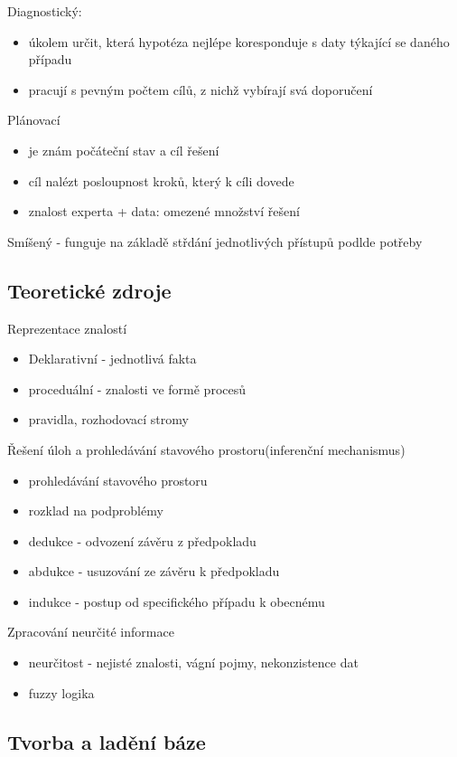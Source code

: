 Diagnostický:
\begin{itemize}
    \item úkolem určit, která hypotéza nejlépe koresponduje s daty týkající se daného případu
    \item pracují s pevným počtem cílů, z nichž vybírají svá doporučení
\end{itemize}
Plánovací
\begin{itemize}
    \item je znám počáteční stav a cíl řešení
    \item cíl nalézt posloupnost kroků, který k cíli dovede
    \item znalost experta + data: omezené množství řešení
\end{itemize}

Smíšený - funguje na základě střdání jednotlivých přístupů podlde potřeby\\

\subsection*{Teoretické zdroje}
Reprezentace znalostí
\begin{itemize}
    \item Deklarativní - jednotlivá fakta
    \item proceduální - znalosti ve formě procesů
    \item pravidla, rozhodovací stromy
\end{itemize}
Řešení úloh a prohledávání stavového prostoru(inferenční mechanismus)
\begin{itemize}
    \item prohledávání stavového prostoru
    \item rozklad na podproblémy
    \item dedukce - odvození závěru z předpokladu
    \item abdukce - usuzování ze závěru k předpokladu
    \item indukce - postup od specifického případu k obecnému
\end{itemize}
Zpracování neurčité informace
\begin{itemize}
    \item neurčitost - nejisté znalosti, vágní pojmy, nekonzistence dat
    \item fuzzy logika
\end{itemize}

\subsection*{Tvorba a ladění báze}
